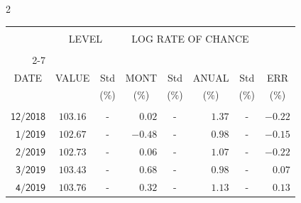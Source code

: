 \begin{multicols}{2}{ 
\begin{tabular}{rccrcrcr} 
\hline 
 \multicolumn{1}{|c|}{}  &  \multicolumn{2}{c|}{} & 
\multicolumn{4}{c}{} & \multicolumn{1}{|c|}{}\vspace{-.10in}\\ 
\multicolumn{1}{|c|}{}  &  \multicolumn{2}{c|}{LEVEL} & 
\multicolumn{4}{c}{LOG RATE OF CHANCE} & \multicolumn{1}{|c|}{}    \\  
\multicolumn{1}{|c|}{}  &  \multicolumn{2}{c|}{} & 
\multicolumn{4}{c}{} & \multicolumn{1}{|c|}{}\vspace{-.10in}\\ \cline{2-7} 
\multicolumn{1}{|c|}{ } &\multicolumn{1}{c|}{ } & \multicolumn{1}{c|}{} & \multicolumn{1}{c|}{} & \multicolumn{1}{c|}{}     & \multicolumn{1}{c|}{} & \multicolumn{1}{c|}{}  & \multicolumn{1}{c|}{}  \vspace{-.05in}\\  
\multicolumn{1}{|c|}{DATE } &\multicolumn{1}{c|}{ VALUE} & \multicolumn{1}{c|}{Std} & \multicolumn{1}{c|}{MONT} & \multicolumn{1}{c|}{Std}     & \multicolumn{1}{c|}{ANUAL} & \multicolumn{1}{c|}{Std}  & \multicolumn{1}{c|}{ERR}\\  
\multicolumn{1}{|c|}{ }      & \multicolumn{1}{c|}{  }    & \multicolumn{1}{c|}{($\%$)}&  \multicolumn{1}{c|}{($\%$)  }  & \multicolumn{1}{c|}{($\%$)} & \multicolumn{1}{c|}{($\%$) }     & \multicolumn{1}{c|}{ ($\%$) }  &  \multicolumn{1}{c|}{ ($\%$) } \\  
 \hline 
 \\$\mathsf{      12/2018}$ &$\mathsf{   103.16}$ &     - &$\mathsf{    0.02}$ &     - &$\mathsf{     1.37 }$ &     - &$\mathsf{  -0.22} $ \vspace{-.005in}\\ 
$\mathsf{       1/2019}$ &$\mathsf{   102.67}$ &     - &$\mathsf{   -0.48}$ &     - &$\mathsf{     0.98 }$ &     - &$\mathsf{  -0.15} $ \vspace{-.005in}\\ 
$\mathsf{       2/2019}$ &$\mathsf{   102.73}$ &     - &$\mathsf{    0.06}$ &     - &$\mathsf{     1.07 }$ &     - &$\mathsf{  -0.22} $ \vspace{-.005in}\\ 
$\mathsf{       3/2019}$ &$\mathsf{   103.43}$ &     - &$\mathsf{    0.68}$ &     - &$\mathsf{     0.98 }$ &     - &$\mathsf{   0.07} $ \vspace{-.005in}\\ 
$\mathsf{       4/2019}$ &$\mathsf{   103.76}$ &     - &$\mathsf{    0.32}$ &     - &$\mathsf{     1.13 }$ &     - &$\mathsf{   0.13} $ \vspace{-.005in}\\ 

\end{tabular}}
\end{multicols}
